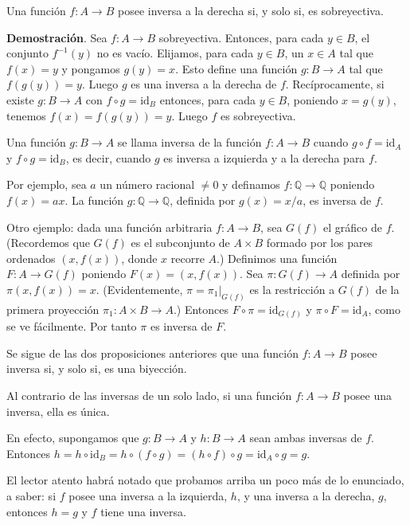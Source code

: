 Una función \(f: A \to B\) posee inversa a la derecha si, y solo si, es sobreyectiva.

\textbf{Demostración}. Sea \(f: A \to B\) sobreyectiva. Entonces, para cada \(y \in B\), el conjunto \(f^{-1}(y)\) no es vacío. Elijamos, para cada \(y \in B\), un \(x \in A\) tal que \(f(x) = y\) y pongamos \(g(y) = x\). Esto define una función \(g: B \to A\) tal que \(f(g(y)) = y\). Luego \(g\) es una inversa a la derecha de \(f\). Recíprocamente, si existe \(g: B \to A\) con \(f \circ g = \text{id}_B\) entonces, para cada \(y \in B\), poniendo \(x = g(y)\), tenemos \(f(x) = f(g(y)) = y\). Luego \(f\) es sobreyectiva.

Una función \(g: B \to A\) se llama inversa de la función \(f: A \to B\) cuando \(g \circ f = \text{id}_A\) y \(f \circ g = \text{id}_B\), es decir, cuando \(g\) es inversa a izquierda y a la derecha para \(f\).

Por ejemplo, sea \(a\) un número racional \(\neq 0\) y definamos \(f: \mathbb{Q} \to \mathbb{Q}\) poniendo \(f(x) = ax\). La función \(g: \mathbb{Q} \to \mathbb{Q}\), definida por \(g(x) = x/a\), es inversa de \(f\).

Otro ejemplo: dada una función arbitraria \(f: A \to B\), sea \(G(f)\) el gráfico de \(f\). (Recordemos que \(G(f)\) es el subconjunto de \(A \times B\) formado por los pares ordenados \((x, f(x))\), donde \(x\) recorre \(A\).) Definimos una función \(F: A \to G(f)\) poniendo \(F(x) = (x, f(x))\). Sea \(\pi: G(f) \to A\) definida por \(\pi(x, f(x)) = x\). (Evidentemente, \(\pi = \pi_1 |_{G(f)}\) es la restricción a \(G(f)\) de la primera proyección \(\pi_1: A \times B \to A\).) Entonces \(F \circ \pi = \text{id}_{G(f)}\) y \(\pi \circ F = \text{id}_A\), como se ve fácilmente. Por tanto \(\pi\) es inversa de \(F\).

Se sigue de las dos proposiciones anteriores que una función \(f: A \to B\) posee inversa si, y solo si, es una biyección.

Al contrario de las inversas de un solo lado, si una función \(f: A \to B\) posee una inversa, ella es única.

En efecto, supongamos que \(g: B \to A\) y \(h: B \to A\) sean ambas inversas de \(f\). Entonces \(h = h \circ \text{id}_B = h \circ (f \circ g) = (h \circ f) \circ g = \text{id}_A \circ g = g\).

El lector atento habrá notado que probamos arriba un poco más de lo enunciado, a saber: si \(f\) posee una inversa a la izquierda, \(h\), y una inversa a la derecha, \(g\), entonces \(h = g\) y \(f\) tiene una inversa.

